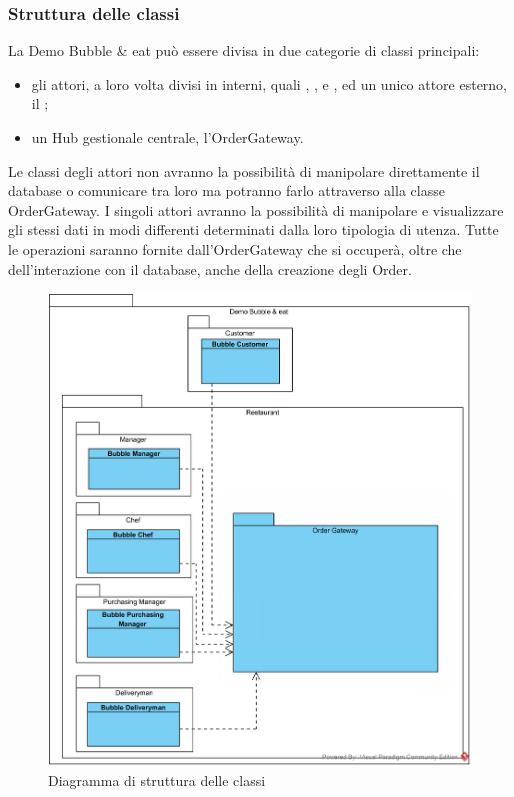 \subsubsection{Struttura delle classi}
La Demo Bubble \& eat può essere divisa in due categorie di classi principali:
\begin{itemize}
	\item gli attori, a loro volta divisi in interni, quali \Manager{}, \Chef{}, \Deliveryman{} e \Purchasingmanager{}, ed un unico attore esterno, il \Customer{};
	\item un Hub gestionale centrale, l’Order\-Gateway.
\end{itemize}
Le classi degli attori non avranno la possibilità di manipolare direttamente il database o comunicare tra loro ma potranno farlo attraverso alla classe Order\-Gateway.
I singoli attori avranno la possibilità di manipolare e visualizzare gli stessi dati in modi differenti determinati dalla loro tipologia di utenza.
Tutte le operazioni saranno fornite dall'Order\-Gateway che si occuperà, oltre che dell'interazione con il database, anche della creazione degli Order.

\begin{figure}[H]
	\centering
	\includegraphics[width=13cm]{diagrammi_img/classi_e_package/demo_classes.png}
	\caption{Diagramma di struttura delle classi}
\end{figure}


